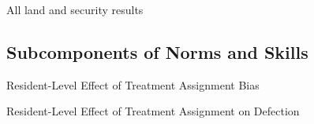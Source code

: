 \documentclass[10pt]{article}
\begin{document}
% 
% 
% 

\begin{table}[H]
\caption{All land and security results}
\begin{center}
\begin{adjustbox}{max width = \textwidth}

\end{adjustbox}
\end{center}
\end{table}



\subsection{Subcomponents of Norms and Skills}

\begin{table}[H]
\caption{Resident-Level Effect of Treatment Assignment Bias}
\begin{center}
\begin{adjustbox}{max width = \textwidth}

\end{adjustbox}
\end{center}
\end{table}

\begin{table}[H]
\caption{Resident-Level Effect of Treatment Assignment on Defection}
\begin{center}
\begin{adjustbox}{max width = \textwidth}

\end{adjustbox}
\end{center}
\end{table}
\end{document}
